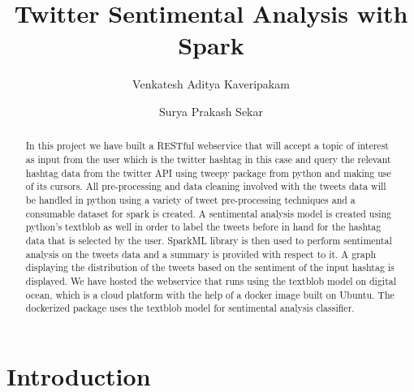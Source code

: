 
\title{Twitter Sentimental Analysis with Spark}


\author{Venkatesh Aditya Kaveripakam}

\author{Surya Prakash Sekar}

\renewcommand{\shortauthors}{Aditya, Surya}

\begin{abstract}

In this project we have built a RESTful webservice that will accept a topic of 
interest as input from the user which is the twitter hashtag in this case and 
query the relevant hashtag data from the twitter API using tweepy package from 
python and making use of its cursors. All pre-processing and data cleaning 
involved with the tweets data will be handled in python using a variety of 
tweet pre-processing techniques and a consumable dataset for spark is created. A 
sentimental analysis model is created using python's textblob as well in order to label 
the tweets before in hand for the hashtag data that is selected by the user. 
SparkML library is then used to perform sentimental analysis on the tweets data 
and a summary is provided with respect to it. A graph displaying the 
distribution of the tweets based on the sentiment of the input hashtag is 
displayed. We have hosted the webservice that runs using the textblob model on 
digital ocean, which is a cloud platform with the help of a docker image built on 
Ubuntu. The dockerized package uses the textblob model for sentimental analysis 
classifier.

\end{abstract}


\maketitle

\section{Introduction}

